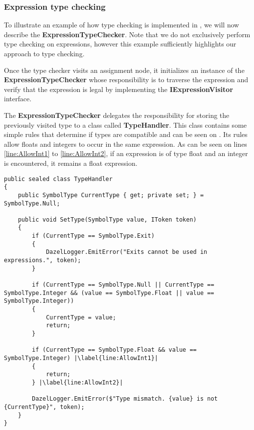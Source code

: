 \subsubsection*{Expression type checking} \label{sec:ExpressionTypeChecking}
To illustrate an example of how type checking is implemented in \dazel{}, we will now describe the \textbf{ExpressionTypeChecker}.
Note that we do not exclusively perform type checking on expressions, however this example sufficiently highlights our approach to type checking.


Once the type checker visits an assignment node, it initializes an instance of the \textbf{ExpressionTypeChecker} whose responsibility is to traverse the expression and verify that the expression is legal by implementing the \textbf{IExpressionVisitor} interface. 

The \textbf{ExpressionTypeChecker} delegates the responsibility for storing the previously visited type to a class called \textbf{TypeHandler}. This class contains some simple rules that determine if types are compatible and can be seen on . 
Its rules allow floats and integers to occur in the same expression. As can be seen on lines \ref{line:AllowInt1} to \ref{line:AllowInt2}, if an expression is of type float and an integer is encountered, it remains a float expression.

\begin{lstlisting}[language=CSharp, caption={The \textbf{TypeHandler} class.}, label={lst:TypeHandler},escapechar=|]
public sealed class TypeHandler
{
    public SymbolType CurrentType { get; private set; } = SymbolType.Null;

    public void SetType(SymbolType value, IToken token)
    {
        if (CurrentType == SymbolType.Exit)
        {
            DazelLogger.EmitError("Exits cannot be used in expressions.", token);
        }
            
        if (CurrentType == SymbolType.Null || CurrentType == SymbolType.Integer && (value == SymbolType.Float || value == SymbolType.Integer))
        {
            CurrentType = value;
            return;
        }
            
        if (CurrentType == SymbolType.Float && value == SymbolType.Integer) |\label{line:AllowInt1}|
        {
            return;
        } |\label{line:AllowInt2}|
            
        DazelLogger.EmitError($"Type mismatch. {value} is not {CurrentType}", token);
    }
}
\end{lstlisting}

